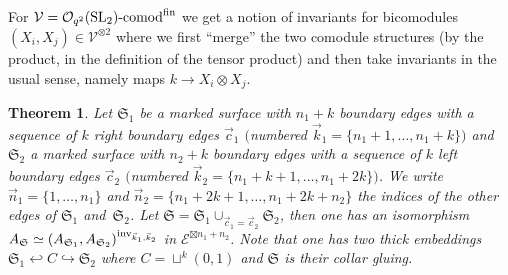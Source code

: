 \documentclass[pdftex]{sigma}%
\numberwithin{equation}{section}
\newtheorem{Theorem}{Theorem}[section]
\newcommand{\Oqcomfin}{\Oq\text{-}{\rm comod}^{\rm fin}}
\newcommand{\Oq}{\mathcal{O}_{q^2}({\rm SL}_2)}
\begin{document}
For $\mathcal{V} = \Oqcomfin$ we get a notion of invariants for bicomodules $(X_i,X_j)\in \mathcal{V}^{\otimes 2}$ where we first ``merge'' the two comodule structures (by the product, in the definition of the tensor product) and then take invariants in the usual sense, namely maps $k \to X_i \otimes X_j$.
\begin{Theorem}\label{thmExcisionAFS}
Let $\mathfrak{S}_1$ be a marked surface with $n_1+k$ boundary edges with a sequence of $k$ right boundary edges $\vec{c}_1$ $($numbered $\vec{k}_1=\{n_1+1,\dots,n_1+k\})$ and $\mathfrak{S}_2$ a marked surface with $n_2+k$ boundary edges with a sequence of $k$ left boundary edges $\vec{c}_2$ $($numbered $\vec{k}_2=\{ n_1+k+1,\dots,n_1+2k\})$. We write $\vec{n}_1 = \{1,\dots,n_1\}$ and $\vec{n}_2 = \{n_1+2k+1,\dots,n_1+2k+n_2\}$ the indices of the other edges of $\mathfrak{S}_1$ and~$\mathfrak{S}_2$. Let $\mathfrak{S} = \mathfrak{S}_1 \cup_{\vec{c}_1=\vec{c}_2}\mathfrak{S}_2$, then one has an isomorphism $A_\mathfrak{S} \simeq (A_{\mathfrak{S}_1}, A_{\mathfrak{S}_2})^{{\rm inv}_{\vec{k}_1,\vec{k}_2}}$ in $\mathcal{E}^{\boxtimes n_1+n_2}$.
Note that one has two thick embeddings $\mathfrak{S}_1 \hookleftarrow C \hookrightarrow \mathfrak{S}_2$ where $C = \sqcup^k (0,1)$ and $\mathfrak{S}$ is their collar gluing.
\end{Theorem}
\end{document}
